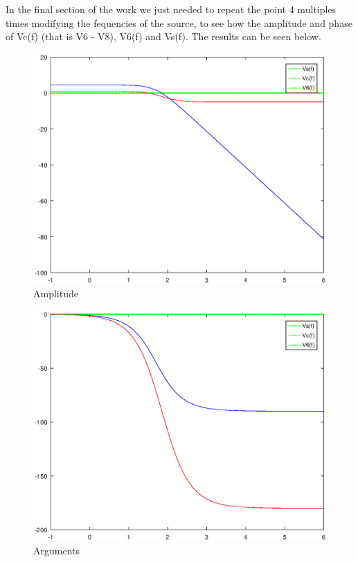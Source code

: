 In the final section of the work we just needed to repeat the point 4 multiples times modifying the fequencies of the source, to see how the amplitude and phase of Vc(f) (that is V6 - V8), V6(f) and Vs(f). The results can be seen below.

\begin{figure}[H]
\centering
\includegraphics[width = 15cm]{Amplitude.eps}
\caption {Amplitude}
\end{figure}

\begin{figure}[H]
\centering
\includegraphics[width = 15cm]{Arguments.eps}
\caption {Arguments}
\end{figure}

















